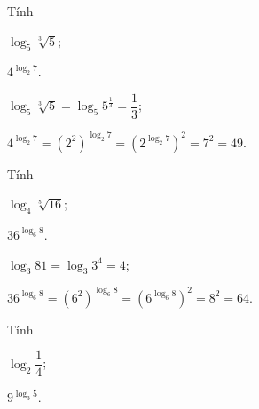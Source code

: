\begin{vd} %
	Tính
	\begin{listEX}[2]
		\item  $\log _{5} \sqrt[3]{5}$;
		\item $4^{\log _{2} 7}$.
	\end{listEX}
	\loigiai
	{\begin{listEX}[1]
			\item $\log _{5} \sqrt[3]{5}=\log _{5} 5^{\frac{1}{3}}=\dfrac{1}{3}$;
			\item $4^{\log _{2} 7}=\left(2^{2}\right)^{\log _{2} 7}=\left(2^{\log _{2} 7}\right)^{2}=7^{2}=49$.
		\end{listEX}
	}
\end{vd}

\begin{vd} %
	Tính
	\begin{listEX}[2]
		\item  $\log _{4} \sqrt[5]{16}$;
		\item $36^{\log _{6} 8}$.
	\end{listEX}
	\loigiai
	{\begin{listEX}[1]
			\item $\log _3 81=\log _3 3^4=4$;
			\item $36^{\log _{6} 8}=\left(6^{2}\right)^{\log _{6} 8}=\left(6^{\log _{6} 8}\right)^{2}=8^{2}=64$.
		\end{listEX}
	}
\end{vd}

\begin{vd}%
	Tính
	\begin{listEX}[2]
		\item[a)] $ \log_2 \dfrac{1}{4}$;
		\item[b)] $ 9^{\log_3 5} $.
	\end{listEX}
\end{vd}

